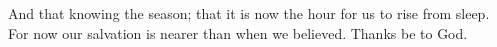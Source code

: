 \noindent And that knowing the season; that it is now the hour for us to rise from sleep. For now our salvation is nearer than when we believed. Thanks be to God.